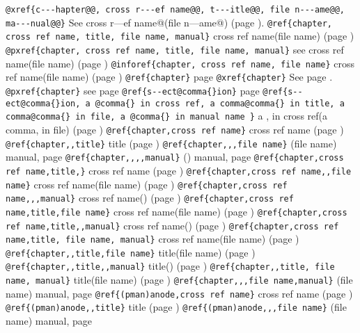\documentclass{book}
\begin{document}
\texttt{@xref\{c{-}{-}{-}hapter@@, cross r{-}{-}{-}ef name@@, t{-}{-}{-}itle@@, file n{-}{-}{-}ame@@, ma{-}{-}{-}nual@@\}} See cross r---ef name@(file n---ame@) (page \pageref{anchor:c_002d_002d_002dhapter_0040}).
\texttt{@ref\{chapter, cross ref name, title, file name, manual\}} cross ref name(file name) (page \pageref{anchor:chapter})
\texttt{@pxref\{chapter, cross ref name, title, file name, manual\}} see cross ref name(file name) (page \pageref{anchor:chapter})
\texttt{@inforef\{chapter, cross ref name, file name\}} cross ref name(file name) (page \pageref{anchor:chapter})
\texttt{@ref\{chapter\}} page \pageref{anchor:chapter}
\texttt{@xref\{chapter\}} See page \pageref{anchor:chapter}.
\texttt{@pxref\{chapter\}} see page \pageref{anchor:chapter}
\texttt{@ref\{s{-}{-}ect@comma\{\}ion\}} page \pageref{anchor:s_002d_002dect_002cion}
\texttt{@ref\{s{-}{-}ect@comma\{\}ion, a @comma\{\} in cross
ref, a comma@comma\{\} in title, a comma@comma\{\} in file, a @comma\{\} in manual name \}}
a , in cross
ref(a comma, in file) (page \pageref{anchor:s_002d_002dect_002cion})
\texttt{@ref\{chapter,cross ref name\}} cross ref name (page \pageref{anchor:chapter})
\texttt{@ref\{chapter,,title\}} title (page \pageref{anchor:chapter})
\texttt{@ref\{chapter,,,file name\}} (file name) manual, page \pageref{anchor:chapter}
\texttt{@ref\{chapter,,,,manual\}} () manual, page \pageref{anchor:chapter}
\texttt{@ref\{chapter,cross ref name,title,\}} cross ref name (page \pageref{anchor:chapter})
\texttt{@ref\{chapter,cross ref name,,file name\}} cross ref name(file name) (page \pageref{anchor:chapter})
\texttt{@ref\{chapter,cross ref name,,,manual\}} cross ref name() (page \pageref{anchor:chapter})
\texttt{@ref\{chapter,cross ref name,title,file name\}} cross ref name(file name) (page \pageref{anchor:chapter})
\texttt{@ref\{chapter,cross ref name,title,,manual\}} cross ref name() (page \pageref{anchor:chapter})
\texttt{@ref\{chapter,cross ref name,title, file name, manual\}} cross ref name(file name) (page \pageref{anchor:chapter})
\texttt{@ref\{chapter,,title,file name\}} title(file name) (page \pageref{anchor:chapter})
\texttt{@ref\{chapter,,title,,manual\}} title() (page \pageref{anchor:chapter})
\texttt{@ref\{chapter,,title, file name, manual\}} title(file name) (page \pageref{anchor:chapter})
\texttt{@ref\{chapter,,,file name,manual\}} (file name) manual, page \pageref{anchor:chapter}
\texttt{@ref\{(pman)anode,cross ref name\}} cross ref name (page \pageref{anchor:_0028pman_0029anode})
\texttt{@ref\{(pman)anode,,title\}} title (page \pageref{anchor:_0028pman_0029anode})
\texttt{@ref\{(pman)anode,,,file name\}} (file name) manual, page \pageref{anchor:_0028pman_0029anode}
\end{document}
